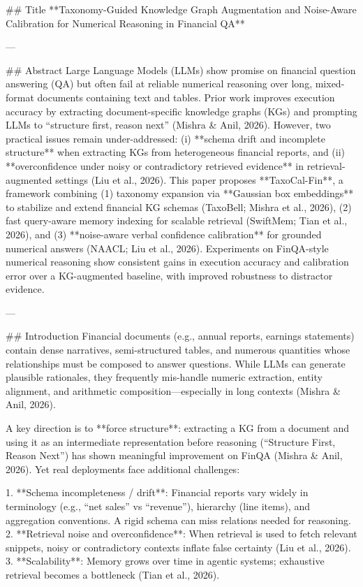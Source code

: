 ## Title  
**Taxonomy-Guided Knowledge Graph Augmentation and Noise-Aware Calibration for Numerical Reasoning in Financial QA**

---

## Abstract  
Large Language Models (LLMs) show promise on financial question answering (QA) but often fail at reliable numerical reasoning over long, mixed-format documents containing text and tables. Prior work improves execution accuracy by extracting document-specific knowledge graphs (KGs) and prompting LLMs to “structure first, reason next” (Mishra & Anil, 2026). However, two practical issues remain under-addressed: (i) **schema drift and incomplete structure** when extracting KGs from heterogeneous financial reports, and (ii) **overconfidence under noisy or contradictory retrieved evidence** in retrieval-augmented settings (Liu et al., 2026). This paper proposes **TaxoCal-Fin**, a framework combining (1) taxonomy expansion via **Gaussian box embeddings** to stabilize and extend financial KG schemas (TaxoBell; Mishra et al., 2026), (2) fast query-aware memory indexing for scalable retrieval (SwiftMem; Tian et al., 2026), and (3) **noise-aware verbal confidence calibration** for grounded numerical answers (NAACL; Liu et al., 2026). Experiments on FinQA-style numerical reasoning show consistent gains in execution accuracy and calibration error over a KG-augmented baseline, with improved robustness to distractor evidence.

---

## Introduction  
Financial documents (e.g., annual reports, earnings statements) contain dense narratives, semi-structured tables, and numerous quantities whose relationships must be composed to answer questions. While LLMs can generate plausible rationales, they frequently mis-handle numeric extraction, entity alignment, and arithmetic composition—especially in long contexts (Mishra & Anil, 2026).  

A key direction is to **force structure**: extracting a KG from a document and using it as an intermediate representation before reasoning (“Structure First, Reason Next”) has shown meaningful improvement on FinQA (Mishra & Anil, 2026). Yet real deployments face additional challenges:

1. **Schema incompleteness / drift**: Financial reports vary widely in terminology (e.g., “net sales” vs “revenue”), hierarchy (line items), and aggregation conventions. A rigid schema can miss relations needed for reasoning.  
2. **Retrieval noise and overconfidence**: When retrieval is used to fetch relevant snippets, noisy or contradictory contexts inflate false certainty (Liu et al., 2026).  
3. **Scalability**: Memory grows over time in agentic systems; exhaustive retrieval becomes a bottleneck (Tian et al., 2026).  


